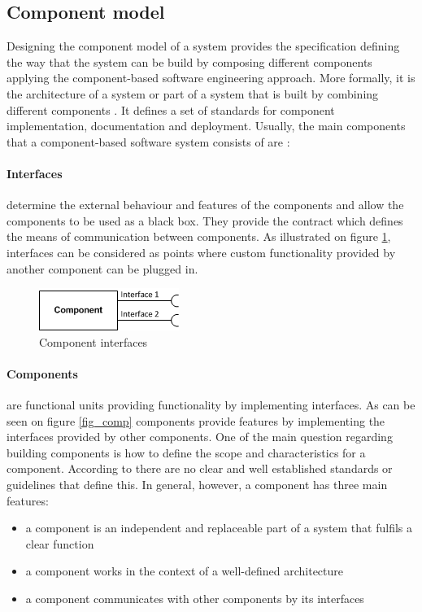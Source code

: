 \subsection{Component model}

Designing the component model of a system provides the specification defining the way that the system can be build by composing different components applying the component-based software engineering approach. More formally, it is the architecture of a system or part of a system that is built by combining different components \cite{Cai}. It defines a set of  standards for component implementation, documentation and deployment. Usually, the main components that a component-based software system consists of are \cite{Chen}:

\paragraph{Interfaces}
	determine the external behaviour and features of the components and allow the components to be used as a black box. They provide the contract which defines the means of communication between components. As illustrated on figure \ref{fig_intf}, interfaces can be considered as points where custom functionality provided by another component can be plugged in. 
	
	\begin{figure}[h!]
  		\centering
  		\includegraphics[scale=0.75]{plug-in/component-interfaces.png}
  		\caption{Component interfaces }
  		\label{fig_intf}
	\end{figure}

\paragraph{Components}
	are functional units providing functionality by implementing interfaces. As can be seen on figure \ref{fig_comp} components provide  features by implementing the interfaces provided by other components. One of the main question regarding building components is how to define the scope and characteristics for a component. According to \cite{Cai} there are no clear and well established standards or guidelines that define this. In general, however, a component has three main features: 

\begin{itemize}
	\item a component is an independent and replaceable part of a system that fulfils a clear function
	\item a component works in the context of a well-defined architecture
	\item a component communicates with other components by its interfaces 
\end{itemize}

